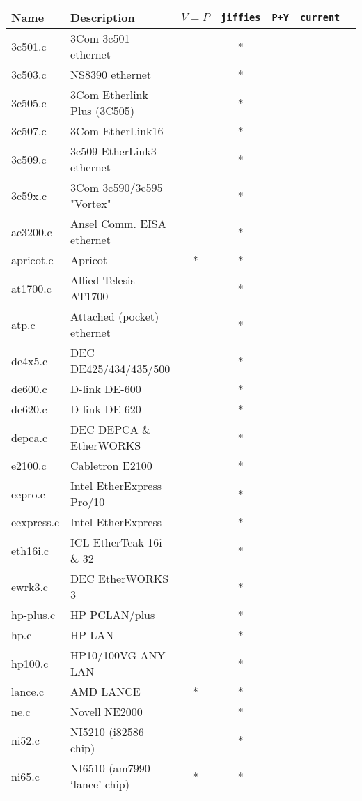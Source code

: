 \begin{table}
\begin{tabular}[c]{|l|l||c|c|c|c|c|}
\hline
Name	& Description			& $V=P$
					  & {\tt jiffies}
					    & {\tt P+Y}
					      & {\tt current}
					        &	\\
\hline
\hline
3c501.c		& 3Com 3c501 ethernet		& &*& &	&	\\\hline
3c503.c		& NS8390 ethernet		& &*& &	&	\\\hline
3c505.c		& 3Com Etherlink Plus (3C505)	& &*& &	&	\\\hline
3c507.c		& 3Com EtherLink16		& &*& &	&	\\\hline
3c509.c		& 3c509 EtherLink3 ethernet	& &*& &	&	\\\hline
3c59x.c		& 3Com 3c590/3c595 "Vortex"	& &*& &	&	\\\hline
ac3200.c	& Ansel Comm. EISA ethernet	& &*& &	&	\\\hline
apricot.c	& Apricot			&*&*& &	&	\\\hline
at1700.c	& Allied Telesis AT1700		& &*& &	&	\\\hline
atp.c		& Attached (pocket) ethernet	& &*& &	&	\\\hline
de4x5.c		& DEC DE425/434/435/500		& &*& &	&	\\\hline
de600.c		& D-link DE-600			& &*& &	&	\\\hline
de620.c		& D-link DE-620			& &*& &	&	\\\hline
depca.c		& DEC DEPCA \& EtherWORKS	& &*& &	&	\\\hline
e2100.c		& Cabletron E2100		& &*& &	&	\\\hline
eepro.c		& Intel EtherExpress Pro/10	& &*& &	&	\\\hline
eexpress.c	& Intel EtherExpress		& &*& &	&	\\\hline
eth16i.c	& ICL EtherTeak 16i \& 32	& &*& &	&	\\\hline
ewrk3.c		& DEC EtherWORKS 3		& &*& &	&	\\\hline
hp-plus.c	& HP PCLAN/plus			& &*& &	&	\\\hline
hp.c		& HP LAN			& &*& &	&	\\\hline
hp100.c		& HP10/100VG ANY LAN		& &*& &	&	\\\hline
lance.c		& AMD LANCE			&*&*& &	&	\\\hline
ne.c		& Novell NE2000			& &*& &	&	\\\hline
ni52.c		& NI5210 (i82586 chip)		& &*& &	&	\\\hline
ni65.c		& NI6510 (am7990 `lance' chip)	&*&*& &	&	\\\hline

\end{tabular}
\end{table}
